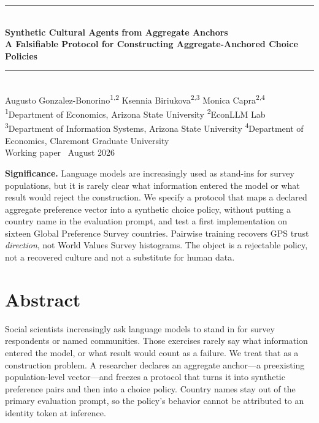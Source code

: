 \documentclass[10pt,letterpaper]{article}
\begin{document}
\thispagestyle{empty}
\begin{center}
\vspace*{0.65cm}
{\color{econblue}\rule{\textwidth}{1.1pt}}\\[0.45em]
{\LARGE\bfseries\color{econblue} Synthetic Cultural Agents from Aggregate Anchors}\\[0.22em]
{\large\bfseries A Falsifiable Protocol for Constructing Aggregate-Anchored Choice Policies}\\[0.42em]
{\color{econblue}\rule{\textwidth}{0.5pt}}\\[0.7em]
{\large Augusto Gonzalez-Bonorino\textsuperscript{1,2} \quad Ksennia Biriukova\textsuperscript{2,3} \quad Monica Capra\textsuperscript{2,4}}\\[0.42em]
{\small \textsuperscript{1}Department of Economics, Arizona State University \quad
\textsuperscript{2}EconLLM Lab}\\[0.15em]
{\small \textsuperscript{3}Department of Information Systems, Arizona State University \quad
\textsuperscript{4}Department of Economics, Claremont Graduate University}\\[0.55em]
{\normalsize Working paper \textperiodcentered\ August 2026}
\end{center}

\vspace{0.35em}

\vspace{0.45em}
\noindent\colorbox{mist}{\parbox{0.965\textwidth}{\small\vspace{0.25em}
\textbf{Significance.} Language models are increasingly used as stand-ins for survey populations, but it is rarely clear what information entered the model or what result would reject the construction. We specify a protocol that maps a declared aggregate preference vector into a synthetic choice policy, without putting a country name in the evaluation prompt, and test a first implementation on sixteen Global Preference Survey countries. Pairwise training recovers GPS trust \emph{direction}, not World Values Survey histograms. The object is a rejectable policy, not a recovered culture and not a substitute for human data.\vspace{0.25em}}}

\section*{Abstract}
Social scientists increasingly ask language models to stand in for survey respondents or named communities. Those exercises rarely say what information entered the model, or what result would count as a failure. We treat that as a construction problem. A researcher declares an aggregate anchor---a preexisting population-level vector---and freezes a protocol that turns it into synthetic preference pairs and then into a choice policy. Country names stay out of the primary evaluation prompt, so the policy's behavior cannot be attributed to an identity token at inference.
\end{document}
